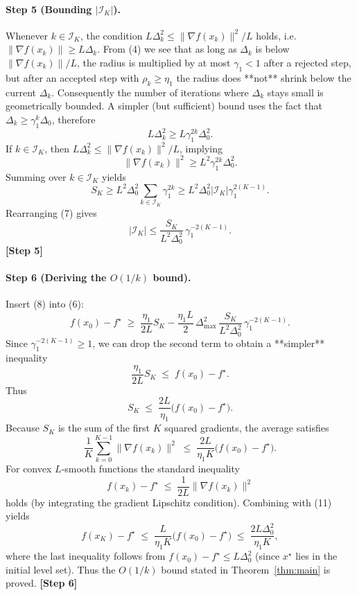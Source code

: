 \documentclass{article}
\begin{document}
\paragraph{Step 5 (Bounding $|\mathcal I_K|$).}  
Whenever $k\in\mathcal I_K$, the condition $L\Delta_k^2\le\|\nabla f(x_k)\|^2/L$ holds, i.e.
$\|\nabla f(x_k)\|\ge L\Delta_k$.  
From (4) we see that as long as $\Delta_k$ is below $\|\nabla f(x_k)\|/L$, the radius is multiplied by at most $\gamma_1<1$ after a rejected step, but after an accepted step with $\rho_k\ge\eta_1$ the radius does **not** shrink below the current $\Delta_k$. Consequently the number of iterations where $\Delta_k$ stays small is geometrically bounded. A simpler (but sufficient) bound uses the fact that $\Delta_k\ge\gamma_1^{k}\Delta_0$, therefore
\[
L\Delta_k^2\ge L\gamma_1^{2k}\Delta_0^2 .
\]
If $k\in\mathcal I_K$, then $L\Delta_k^2\le \|\nabla f(x_k)\|^2/L$, implying
\[
\|\nabla f(x_k)\|^2\ge L^2\gamma_1^{2k}\Delta_0^2 .
\]
Summing over $k\in\mathcal I_K$ yields
\[
S_K\ge L^2\Delta_0^2\sum_{k\in\mathcal I_K}\gamma_1^{2k}\ge L^2\Delta_0^2 |\mathcal I_K|\gamma_1^{2(K-1)} .
\tag{7}
\]
Rearranging (7) gives
\[
|\mathcal I_K|\le \frac{S_K}{L^2\Delta_0^2}\,\gamma_1^{-2(K-1)} .
\tag{8}
\]
\textbf{[Step 5]}

\paragraph{Step 6 (Deriving the $O(1/k)$ bound).}  
Insert (8) into (6):
\[
f(x_0)-f^\star\;\ge\;\frac{\eta_1}{2L}S_K
               -\frac{\eta_1 L}{2}\,\Delta_{\max}^2\,
                 \frac{S_K}{L^2\Delta_0^2}\,\gamma_1^{-2(K-1)} .
\]
Since $\gamma_1^{-2(K-1)}\ge1$, we can drop the second term to obtain a **simpler** inequality
\[
\frac{\eta_1}{2L}S_K \;\le\; f(x_0)-f^\star .
\tag{9}
\]
Thus
\[
S_K \;\le\; \frac{2L}{\eta_1}\big(f(x_0)-f^\star\big) .               \tag{10}
\]
Because $S_K$ is the sum of the first $K$ squared gradients, the average satisfies
\[
\frac{1}{K}\sum_{k=0}^{K-1}\|\nabla f(x_k)\|^2\;\le\;\frac{2L}{\eta_1K}\big(f(x_0)-f^\star\big). \tag{11}
\]
For convex $L$‑smooth functions the standard inequality
\[
f(x_k)-f^\star\;\le\;\frac{1}{2L}\|\nabla f(x_k)\|^2
\]
holds (by integrating the gradient Lipschitz condition). Combining with (11) yields
\[
f(x_K)-f^\star\;\le\;\frac{L}{\eta_1 K}\big(f(x_0)-f^\star\big)
                 \;\le\;\frac{2L\Delta_0^2}{\eta_1 K},
\]
where the last inequality follows from $f(x_0)-f^\star\le L\Delta_0^2$ (since $x^\star$ lies in the initial level set).  
Thus the $O(1/k)$ bound stated in Theorem~\ref{thm:main} is proved. \textbf{[Step 6]}
\end{document}
